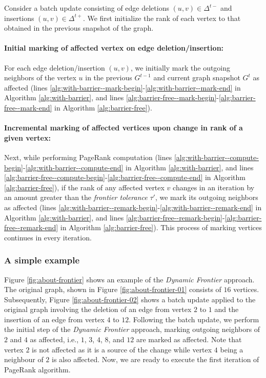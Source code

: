 Consider a batch update consisting of edge deletions $(u, v) \in \Delta^{t-}$ and insertions $(u, v) \in \Delta^{t+}$. We first initialize the rank of each vertex to that obtained in the previous snapshot of the graph.



\paragraph{Initial marking of affected vertex on edge deletion/insertion:}

For each edge deletion/insertion $(u, v)$, we initially mark the outgoing neighbors of the vertex $u$ in the previous $G^{t-1}$ and current graph snapshot $G^t$ as affected (lines \ref{alg:with-barrier--mark-begin}-\ref{alg:with-barrier--mark-end} in Algorithm \ref{alg:with-barrier}, and lines \ref{alg:barrier-free--mark-begin}-\ref{alg:barrier-free--mark-end} in Algorithm \ref{alg:barrier-free}).

\paragraph{Incremental marking of affected vertices upon change in rank of a given vertex:}

Next, while performing PageRank computation (lines \ref{alg:with-barrier--compute-begin}-\ref{alg:with-barrier--compute-end} in Algorithm \ref{alg:with-barrier}, and lines \ref{alg:barrier-free--compute-begin}-\ref{alg:barrier-free--compute-end} in Algorithm \ref{alg:barrier-free}), if the rank of any affected vertex $v$ changes in an iteration by an amount greater than the \textit{frontier tolerance} $\tau'$, we mark its outgoing neighbors as affected (lines \ref{alg:with-barrier--remark-begin}-\ref{alg:with-barrier--remark-end} in Algorithm \ref{alg:with-barrier}, and lines \ref{alg:barrier-free--remark-begin}-\ref{alg:barrier-free--remark-end} in Algorithm \ref{alg:barrier-free}). This process of marking vertices continues in every iteration.

% 
% 


\subsubsection{A simple example}

Figure \ref{fig:about-frontier} shows an example of the \textit{Dynamic Frontier} approach. The original graph, shown in Figure \ref{fig:about-frontier-01} consists of $16$ vertices. Subsequently, Figure \ref{fig:about-frontier-02} shows a batch update applied to the original graph involving the deletion of an edge from vertex $2$ to $1$ and the insertion of an edge from vertex $4$ to $12$. Following the batch update, we perform the initial step of the \textit{Dynamic Frontier} approach, marking outgoing neighbors of $2$ and $4$ as affected, i.e., $1$, $3$, $4$, $8$, and $12$ are marked as affected. Note that vertex $2$ is not affected as it is a source of the change while vertex $4$ being a neighbour of $2$ is also affected. Now, we are ready to execute the first iteration of PageRank algorithm.

